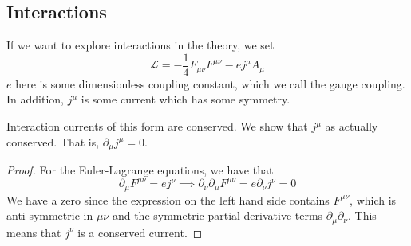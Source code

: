 \subsection{Interactions} 
If we want to explore interactions in the theory, 
we set 
\[
 \mathcal{ L }  = - \frac{1}{4 } F _{ \mu \nu } F ^{ \mu \nu }  - e j ^ \mu A _ \mu 
\] $ e $ here is some dimensionless coupling constant, 
which we call the gauge coupling. In addition, $ j ^ \mu $ 
is some current which has some symmetry. 

\begin{claim}{Interaction currents of this form are conserved.}
	We show that $ j ^ \mu $ as actually conserved. 
	That is, $ \partial  _ \mu j ^ \mu  = 0 $. 
	\begin{proof}
	For the Euler-Lagrange equations, we have that 
\[
 \partial  _ \mu F ^{ \mu \nu }  = e j ^ \nu \implies \partial  _ \nu \partial  _ \mu F ^{ \mu \nu } 
  = e \partial  _ \nu j ^ \nu  = 0 
\] We have a zero since the expression 
on the left hand side contains $ F^{ \mu \nu } $, 
which is anti-symmetric in $ \mu \nu $ and the 
symmetric partial derivative terms $ \partial  _ \mu \partial  _ \nu $. 
This means that $ j ^ \nu $ is a conserved current. 	
	\end{proof}
\end{claim}
